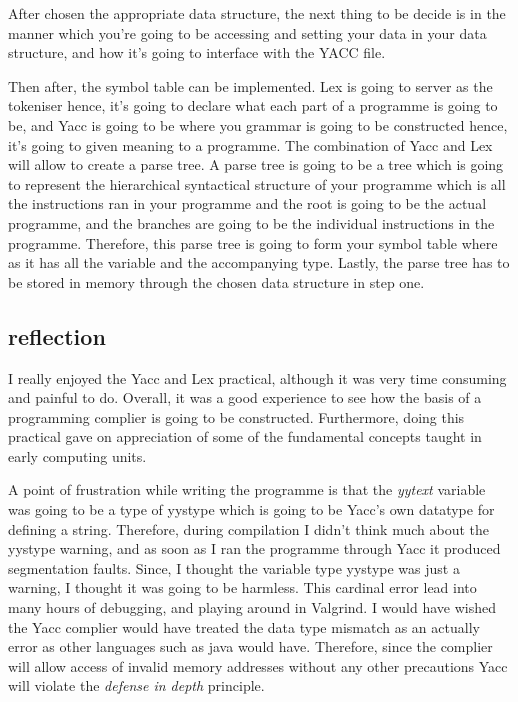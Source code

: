 \documentclass[
	12pt, %
]{fphw}
\begin{document}
After chosen the appropriate data structure, the next thing to be decide is in
the manner which you're going to be accessing and setting your data in your data
structure, and how it's going to interface with the YACC file.\par

Then after, the symbol table can be implemented. Lex is going to server as the
tokeniser hence, it's going to declare what each part of a programme is going to
be, and Yacc is going to be where you grammar is going to be constructed hence,
it's going to given meaning to a programme. The combination of Yacc and Lex will
allow to create a parse tree. A parse tree is going to be a tree which is going
to represent the hierarchical syntactical structure of your programme which is
all the instructions ran in your programme and the root is going to be the actual
programme, and the branches are going to be the individual instructions in the
programme. Therefore, this parse tree is going to form your symbol table where as it
has all the variable and the accompanying type. Lastly, the parse tree has to
be stored in memory through the chosen data structure
in step one.

\subsection{reflection}
I really enjoyed the Yacc and Lex practical, although it was very time consuming
and painful to do. Overall, it was a good experience to see how the basis of
a programming complier is going to be constructed. Furthermore, doing this
practical gave on appreciation of some of the fundamental concepts taught in early
computing units. \par

A point of frustration while writing the programme is that the \emph{yytext}
variable was going to be a type of yystype which is going to be Yacc's own datatype
for defining a string. Therefore, during compilation I didn't think much about the
yystype warning, and as soon as I ran the programme through Yacc it produced segmentation faults.
Since, I thought the variable type yystype was just a warning, I thought it was going to be harmless.
This cardinal error lead into many hours of debugging, and playing around in Valgrind.
I would have wished the Yacc complier would have treated the data type mismatch
as an actually error as other languages such as java would have. Therefore,
since the complier will allow access of invalid memory addresses without any
other precautions Yacc will violate the \emph{defense in depth} principle. \par
\end{document}
